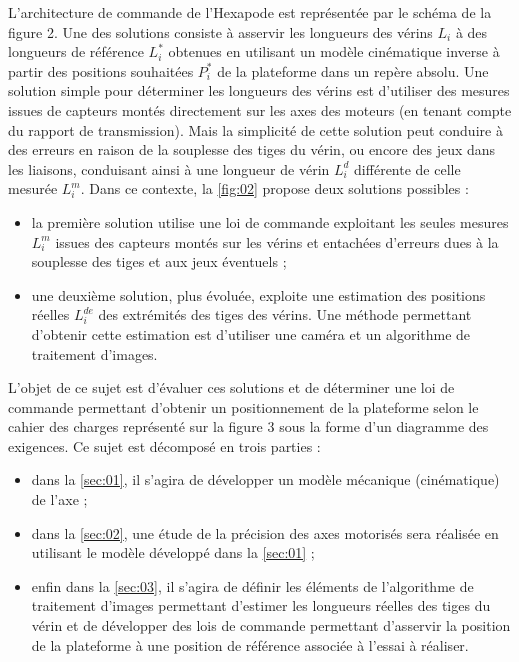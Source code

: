 L’architecture de commande de l’Hexapode est représentée par le schéma de la figure 2. Une des solutions
consiste à asservir les longueurs des vérins $L_i$ à des longueurs de référence $L_i^*$ 
obtenues en utilisant un modèle cinématique inverse à partir des positions souhaitées $P_i^*$ 
de la plateforme dans un repère absolu. Une solution
simple pour déterminer les longueurs des vérins est d’utiliser des mesures issues de capteurs montés directement
sur les axes des moteurs (en tenant compte du rapport de transmission). Mais la simplicité de cette solution
peut conduire à des erreurs en raison de la souplesse des tiges du vérin, ou encore des jeux dans les liaisons,
conduisant ainsi à une longueur de vérin $L_i^d$ 
différente de celle mesurée $L_i^m$. Dans ce contexte, la \autoref{fig:02} propose
deux solutions possibles :
\begin{itemize}
\item la première solution utilise une loi de commande exploitant les seules mesures $L_i^m$ issues des capteurs montés
sur les vérins et entachées d’erreurs dues à la souplesse des tiges et aux jeux éventuels ;
\item une deuxième solution, plus évoluée, exploite une estimation des positions réelles $L_i^{de}$ des extrémités des tiges
des vérins. Une méthode permettant d’obtenir cette estimation est d’utiliser une caméra et un algorithme
de traitement d’images.
\end{itemize}
L’objet de ce sujet est d’évaluer ces solutions et de déterminer une loi de commande permettant d’obtenir
un positionnement de la plateforme selon le cahier des charges représenté sur la figure 3 sous la forme d’un
diagramme des exigences. Ce sujet est décomposé en trois parties :
\begin{itemize}
\item dans la \autoref{sec:01}, il s’agira de développer un modèle mécanique (cinématique) de l’axe ;
\item dans la \autoref{sec:02}, une étude de la précision des axes motorisés sera réalisée en utilisant le modèle développé
dans la \autoref{sec:01} ;
\item enfin dans la \autoref{sec:03}, il s’agira de définir les éléments de l’algorithme de traitement d’images permettant
d’estimer les longueurs réelles des tiges du vérin et de développer des lois de commande permettant d’asservir
la position de la plateforme à une position de référence associée à l’essai à réaliser.
\end{itemize}


